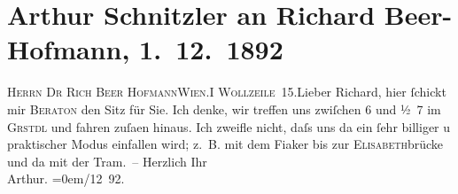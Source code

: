 

         
         \renewcommand{\erwaehntePersonen}{Personen: Richard Beer-Hofmann, Ferry Bératon}
         \renewcommand{\erwaehnteOrte}{Orte: Café Griensteidl, Elisabethbrücke, Wien, Wollzeile}
         \renewcommand{\erwaehnteWerke}{}
               \section[Arthur Schnitzler an Richard Beer-Hofmann, 1. 12. 1892]{ Arthur Schnitzler an Richard Beer-Hofmann, 1. 12. 1892}\nopagebreak{}\rehead{ }\begin{ledgroupsized}[t]{13cm}\normalsize\beginnumbering{} \toendnotes[C]{\smallbreak\pagebreak[2]} 
\pstart{}{\pb}\textsc{Herrn Dr Rich Beer Hofmann}\pend{}\pstart{}\textsc{Wien.}\pend{}\pstart{}\textsc{I Wollzeile 15}.\pend{}{\bigskip}\pstart{}{\pb}Lieber Richard, \pend\pstart
           hier ſchickt mir \textsc{Beraton} den Sitz für Sie. Ich denke, wir treffen uns zwiſchen 6 und
                  ½ 7 im \textsc{Grstdl} und fahren zuſa{\geminationm}en hinaus. Ich zweifle nicht, daſs
               uns da ein ſehr billiger \introOben{}u praktischer\introOben{} Modus einfallen wird;
               z. B. mit dem Fiaker bis zur \textsc{Elisabeth}brücke und da{\geminationn}{ }{\pb}mit der Tram. –\pend
           \pstart
           Herzlich Ihr{\\[\baselineskip]}\spacefill\mbox{Arthur.}\pend
           \leftskip=0em{}/12 92. \pend
           
         
         \endnumbering{}\end{ledgroupsized}  \newcommand{\dateiname}{L00140}\newcommand{\titel}{Arthur Schnitzler an Richard Beer-Hofmann, 1. 12. 1892}\newcommand{\editorInnen}{Martin Anton Müller und Gerd-Hermann Susen}
      